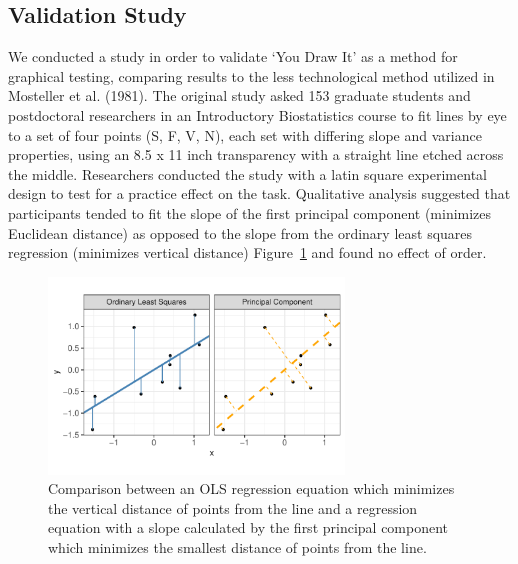\documentclass[
]{jds}
\begin{document}
\hypertarget{validation-study}{%
\subsection{Validation Study}\label{validation-study}}

We conducted a study in order to validate `You Draw It' as a method for
graphical testing, comparing results to the less technological method
utilized in Mosteller et al. (1981). The original study asked 153
graduate students and postdoctoral researchers in an Introductory
Biostatistics course to fit lines by eye to a set of four points (S, F,
V, N), each set with differing slope and variance properties, using an
8.5 x 11 inch transparency with a straight line etched across the
middle. Researchers conducted the study with a latin square experimental
design to test for a practice effect on the task. Qualitative analysis
suggested that participants tended to fit the slope of the first
principal component (minimizes Euclidean distance) as opposed to the
slope from the ordinary least squares regression (minimizes vertical
distance) Figure~\ref{fig-pca-plot} and found no effect of order.

\begin{figure}

{\centering \includegraphics[width=0.7\textwidth,height=\textheight]{./images/fig-pca-plot-1.pdf}

}

\caption{\label{fig-pca-plot}Comparison between an OLS regression
equation which minimizes the vertical distance of points from the line
and a regression equation with a slope calculated by the first principal
component which minimizes the smallest distance of points from the
line.}

\end{figure}
\end{document}

